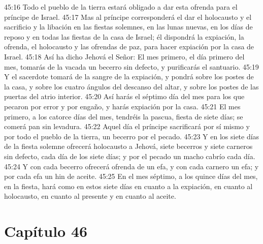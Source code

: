 45:16 Todo el pueblo de la tierra estará obligado a dar esta ofrenda para el príncipe de Israel.   
45:17 Mas al príncipe corresponderá el dar el holocausto y el sacrificio y la libación en las fiestas solemnes, en las lunas nuevas, en los días de reposo y en todas las fiestas de la casa de Israel; él dispondrá la expiación, la ofrenda, el holocausto y las ofrendas de paz, para hacer expiación por la casa de Israel.   
45:18 Así ha dicho Jehová el Señor: El mes primero, el día primero del mes, tomarás de la vacada un becerro sin defecto, y purificarás el santuario.   
45:19 Y el sacerdote tomará de la sangre de la expiación, y pondrá sobre los postes de la casa, y sobre los cuatro ángulos del descanso del altar, y sobre los postes de las puertas del atrio interior.   
45:20 Así harás el séptimo día del mes para los que pecaron por error y por engaño, y harás expiación por la casa.   
45:21 El mes primero, a los catorce días del mes, tendréis la pascua, fiesta de siete días; se comerá pan sin levadura. 
45:22 Aquel día el príncipe sacrificará por sí mismo y por todo el pueblo de la tierra, un becerro por el pecado.   
45:23 Y en los siete días de la fiesta solemne ofrecerá holocausto a Jehová, siete becerros y siete carneros sin defecto, cada día de los siete días; y por el pecado un macho cabrío cada día.   
45:24 Y con cada becerro ofrecerá ofrenda de un efa, y con cada carnero un efa; y por cada efa un hin de aceite.   
45:25 En el mes séptimo, a los quince días del mes, en la fiesta, hará como en estos siete días  en cuanto a la expiación, en cuanto al holocausto, en cuanto al presente y en cuanto al aceite.   
\section*{Capítulo 46}  
  
